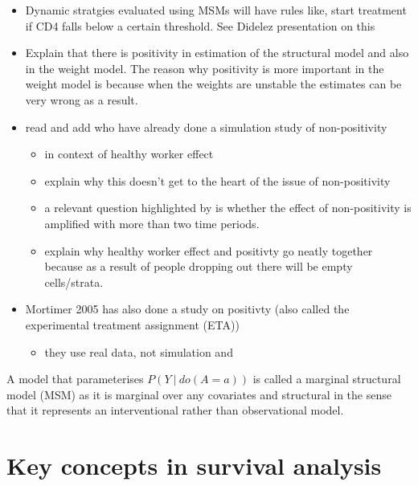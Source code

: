 \documentclass[11pt]{article}
\providecommand{\tightlist}{%
      \setlength{\itemsep}{0pt}\setlength{\parskip}{0pt}}
\begin{document}
\begin{itemize}
\tightlist
\item
  Dynamic stratgies evaluated using MSMs will have rules like, start
  treatment if CD4 falls below a certain threshold. See Didelez
  presentation on this
\item
  Explain that there is positivity in estimation of the structural model
  and also in the weight model. The reason why positivity is more
  important in the weight model is because when the weights are unstable
  the estimates can be very wrong as a result.
\item
  read and add \citet{Naimi2011} who have already done a simulation
  study of non-positivity

  \begin{itemize}
  \tightlist
  \item
    in context of healthy worker effect
  \item
    explain why this doesn't get to the heart of the issue of
    non-positivity
  \item
    a relevant question highlighted by \citet{Naimi2011} is whether the
    effect of non-positivity is amplified with more than two time
    periods.
  \item
    explain why healthy worker effect and positivty go neatly together
    because as a result of people dropping out there will be empty
    cells/strata.
  \end{itemize}
\item
  Mortimer 2005 has also done a study on positivty (also called the
  experimental treatment assignment (ETA))

  \begin{itemize}
  \tightlist
  \item
    they use real data, not simulation and
  \end{itemize}
\end{itemize}

    A model that parameterises \(P(Y\ |\ do(A=a))\) is called a marginal
structural model (MSM) as it is marginal over any covariates and
structural in the sense that it represents an interventional rather than
observational model.

    \newpage

    \section{Key concepts in survival
analysis}\label{key-concepts-in-survival-analysis}
\end{document}
